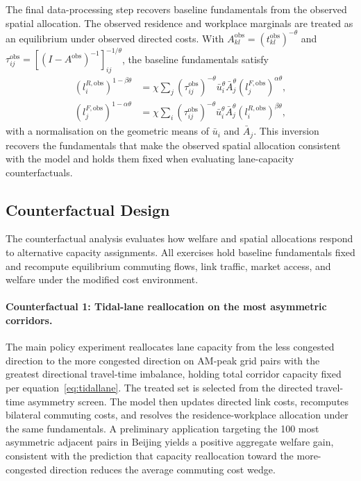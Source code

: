 \documentclass[12pt]{article}
\begin{document}
The final data-processing step recovers baseline fundamentals from the observed spatial allocation. The observed residence and workplace marginals are treated as an equilibrium under observed directed costs. With $A^{\mathrm{obs}}_{kl}=(t^{\mathrm{obs}}_{kl})^{-\theta}$ and $\tau_{ij}^{\mathrm{obs}}=[(I-A^{\mathrm{obs}})^{-1}]_{ij}^{-1/\theta}$, the baseline fundamentals satisfy
\begin{align}
  (l_i^{R,\mathrm{obs}})^{1-\beta\theta}
  &=
  \chi\sum_j(\tau_{ij}^{\mathrm{obs}})^{-\theta}\bar u_i^\theta\bar A_j^\theta
  (l_j^{F,\mathrm{obs}})^{\alpha\theta},
  \label{eq:invert_R}\\
  (l_j^{F,\mathrm{obs}})^{1-\alpha\theta}
  &=
  \chi\sum_i(\tau_{ij}^{\mathrm{obs}})^{-\theta}\bar u_i^\theta\bar A_j^\theta
  (l_i^{R,\mathrm{obs}})^{\beta\theta},
  \label{eq:invert_F}
\end{align}
with a normalisation on the geometric means of $\bar u_i$ and $\bar A_j$. This inversion recovers the fundamentals that make the observed spatial allocation consistent with the model and holds them fixed when evaluating lane-capacity counterfactuals.

\subsection{Counterfactual Design}
\label{ssec:cf}

The counterfactual analysis evaluates how welfare and spatial allocations respond to alternative capacity assignments. All exercises hold baseline fundamentals fixed and recompute equilibrium commuting flows, link traffic, market access, and welfare under the modified cost environment.

\paragraph{Counterfactual 1: Tidal-lane reallocation on the most asymmetric corridors.}
The main policy experiment reallocates lane capacity from the less congested direction to the more congested direction on AM-peak grid pairs with the greatest directional travel-time imbalance, holding total corridor capacity fixed per equation~\eqref{eq:tidallane}. The treated set is selected from the directed travel-time asymmetry screen. The model then updates directed link costs, recomputes bilateral commuting costs, and resolves the residence-workplace allocation under the same fundamentals. A preliminary application targeting the 100 most asymmetric adjacent pairs in Beijing yields a positive aggregate welfare gain, consistent with the prediction that capacity reallocation toward the more-congested direction reduces the average commuting cost wedge.
\end{document}
